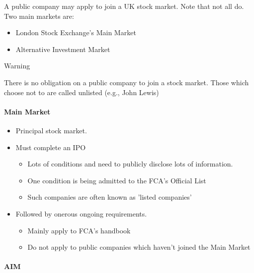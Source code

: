 \documentclass[
]{article}
\providecommand{\tightlist}{%
  \setlength{\itemsep}{0pt}\setlength{\parskip}{0pt}}
\newenvironment{env-000f37c3-ffb3-4c61-bb50-531363766f0b}
{
    \savenotes\tcolorbox[blanker,breakable,left=5pt,borderline west={2pt}{-4pt}{orange}]
}
{
    \endtcolorbox\spewnotes
}
\begin{document}
A public company may apply to join a UK stock market. Note that not all
do. Two main markets are:

\begin{itemize}
\tightlist
\item
  London Stock Exchange's Main Market
\item
  Alternative Investment Market
\end{itemize}

\begin{env-000f37c3-ffb3-4c61-bb50-531363766f0b}

Warning

There is no obligation on a public company to join a stock market. Those
which choose not to are called unlisted (e.g., John Lewis)

\end{env-000f37c3-ffb3-4c61-bb50-531363766f0b}

\hypertarget{main-market}{%
\paragraph{Main Market}\label{main-market}}

\begin{itemize}
\tightlist
\item
  Principal stock market.
\item
  Must complete an IPO

  \begin{itemize}
  \tightlist
  \item
    Lots of conditions and need to publicly disclose lots of
    information.
  \item
    One condition is being admitted to the FCA's Official List
  \item
    Such companies are often known as 'listed companies'
  \end{itemize}
\item
  Followed by onerous ongoing requirements.

  \begin{itemize}
  \tightlist
  \item
    Mainly apply to FCA's handbook
  \item
    Do not apply to public companies which haven't joined the Main
    Market
  \end{itemize}
\end{itemize}

\hypertarget{aim}{%
\paragraph{AIM}\label{aim}}
\end{document}
